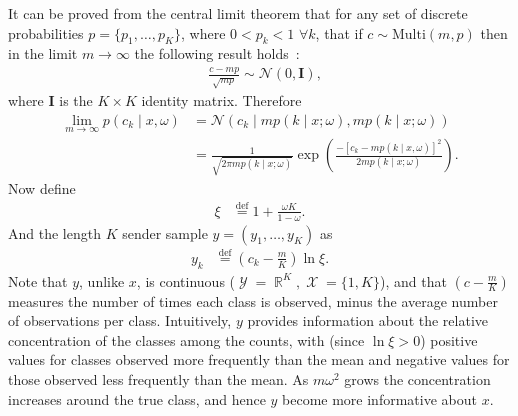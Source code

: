 \documentclass[11pt,table]{article}
\DeclareMathOperator{\X}{\mathcal{X}}
\DeclareMathOperator{\Y}{\mathcal{Y}}
\newcommand{\N}[2]{\mathcal{N}\left(#1 , #2\right)}
\DeclareMathOperator{\R}{\mathbb{R}}
\newcommand{\I}[1]{\boldsymbol{I}}
\newcommand*{\defeq}{\stackrel{\text{def}}{=}}
\newcommand{\0}[1]{\constvec{0}{#1}}
\newcommand{\1}[1]{\constvec{1}{#1}}
\begin{document}
It can be proved from the central limit theorem that for any set of discrete probabilities $p = \{p_1,\dots,p_K\}$, where $0 < p_k < 1$ $\forall k$, that if $c \sim \text{Multi}(m, p)$ then in the limit $m \rightarrow \infty$ the following result holds~\cite{georgii2008stochastics}:
\begin{align}
&\frac{c - m p}{\sqrt{m p}} \sim \N{0}{\I{K}},
\end{align}
where $\I{K}$ is the $K \times K$ identity matrix.
Therefore
\begin{align}
\lim_{m\rightarrow \infty} p(c_k \mid x,\omega) &= \N{c_k \mid m p(k \mid x; \omega)}{m p(k \mid x; \omega)}\\
&= \frac{1}{\sqrt{2\pi m p(k \mid x; \omega)}}\exp\left(\frac{-\left[c_k - m p(k \mid x,\omega)\right]^2}{2 m p(k \mid x; \omega)}\right).
\end{align}
Now define
\begin{align}
\xi &\defeq 1 + \frac{\omega K}{1-\omega}\label{gamma_def}.
\end{align}
And the length $K$ sender sample $y = (y_1,\dots,y_K)$ as
\begin{align}
y_k &\defeq \left(c_k - \frac{m}{K}\right) \ln \xi\label{y_def}.
\end{align}
Note that $y$, unlike $x$, is continuous ($\Y = \R^{K}, \X = \{1,K\}$), and that $\left(c - \frac{m}{K}\right)$ measures the number of times each class is observed, minus the average number of observations per class.
Intuitively, $y$ provides information about the relative concentration of the classes among the counts, with (since $\ln \xi > 0$) positive values for classes observed more frequently than the mean and negative values for those observed less frequently than the mean. 
As $m \omega^2$ grows the concentration increases around the true class, and hence $y$ become more informative about $x$.
\end{document}
